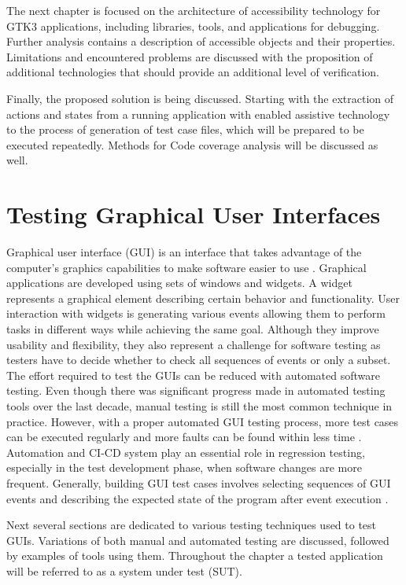 The next chapter is focused on the architecture of accessibility technology for GTK3 applications, including libraries, tools, and applications for debugging. Further analysis contains a description of accessible objects and their properties. Limitations and encountered problems are discussed with the proposition of additional technologies that should provide an additional level of verification. 

Finally, the proposed solution is being discussed. Starting with the extraction of actions and states from a running application with enabled assistive technology to the process of generation of test case files, which will be prepared to be executed repeatedly. Methods for Code coverage analysis will be discussed as well. 

\chapter{Testing Graphical User Interfaces}\label{chapter_1}
Graphical user interface (GUI) is an interface that takes advantage of the computer's graphics capabilities to make software easier to use \cite{guidefinition}. Graphical applications are developed using sets of windows and widgets. A widget represents a graphical element describing certain behavior and functionality. User interaction with widgets is generating various events allowing them to perform tasks in different ways while achieving the same goal. Although they improve usability and flexibility, they also represent a challenge for software testing as testers have to decide whether to check all sequences of events or only a subset. The effort required to test the GUIs can be reduced with automated software testing. Even though there was significant progress made in automated testing tools over the last decade, manual testing is still the most common technique in practice. However, with a proper automated GUI testing process, more test cases can be executed regularly and more faults can be found within less time \cite{patternbasedtesting}. Automation and CI-CD system play an essential role in regression testing, especially in the test development phase, when software changes are more frequent. Generally, building GUI test cases involves selecting sequences of GUI events and describing the expected state of the program after event execution \cite{NguyenBao2014Gait}.

Next several sections are dedicated to various testing techniques used to test GUIs. Variations of both manual and automated testing are discussed, followed by examples of tools using them. Throughout the chapter a tested application will be referred to as a system under test (SUT).

